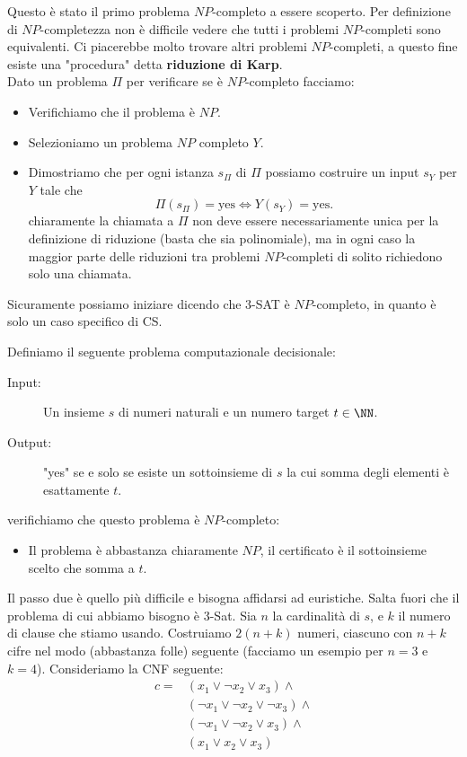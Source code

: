 \documentclass[11pt]{scrartcl}
\begin{document}
	Questo è stato il primo problema $NP$-completo a essere scoperto. Per definizione di $NP$-completezza non è difficile vedere che tutti i problemi $NP$-completi sono equivalenti. Ci piacerebbe molto trovare altri problemi $NP$-completi, a questo fine esiste una "procedura" detta \textbf{riduzione di Karp}. \\
	Dato un problema $\Pi$ per verificare se è $NP$-completo facciamo:
	\begin{itemize}
		\item[(1)] Verifichiamo che il problema è $NP$.
		\item[(2)] Selezioniamo un problema $NP$ completo $Y$.
		\item[(3)] Dimostriamo che per ogni istanza $s_\Pi$ di $\Pi$ possiamo costruire un input $s_Y$ per $Y$ tale che 
		$$\Pi(s_\Pi)=\text{yes}\iff Y(s_Y)=\text{yes}.$$
		chiaramente la chiamata a $\Pi$ non deve essere necessariamente unica per la definizione di riduzione (basta che sia polinomiale), ma in ogni caso la maggior parte delle riduzioni tra problemi $NP$-completi di solito richiedono solo una chiamata. 
	\end{itemize}
	Sicuramente possiamo iniziare dicendo che $3$-SAT è $NP$-completo, in quanto è solo un caso specifico di CS.
	\begin{example}
		Definiamo il seguente problema computazionale decisionale:
		\begin{description}
			\item[Input:] Un insieme $s$ di numeri naturali e un numero target $t\in\NN$.
			\item[Output:] "yes" se e solo se esiste un sottoinsieme di $s$ la cui somma degli elementi è esattamente $t$.
		\end{description}
	\end{example}
	verifichiamo che questo problema è $NP$-completo:
	\begin{itemize}
		\item[(1)] Il problema è abbastanza chiaramente $NP$, il certificato è il sottoinsieme scelto che somma a $t$.
	\end{itemize}
	Il passo due è quello più difficile e bisogna affidarsi ad euristiche. Salta fuori che il problema di cui abbiamo bisogno è $3$-Sat. Sia $n$ la cardinalità di $s$, e $k$ il numero di clause che stiamo usando. Costruiamo $2(n+k)$ numeri, ciascuno con $n+k$ cifre nel modo (abbastanza folle) seguente (facciamo un esempio per $n=3$ e $k=4$). Consideriamo la CNF seguente:
	\begin{align*}
		c= &(x_1\lor \lnot x_2 \lor x_3)\land  \\
		 &(\lnot x_1 \lor \lnot x_2 \lor \lnot x_3)\land   \\
		&(\lnot x_1 \lor \lnot x_2 \lor x_3) \land  \\
		&(x_1 \lor x_2 \lor x_3) 
	\end{align*}
\end{document}
